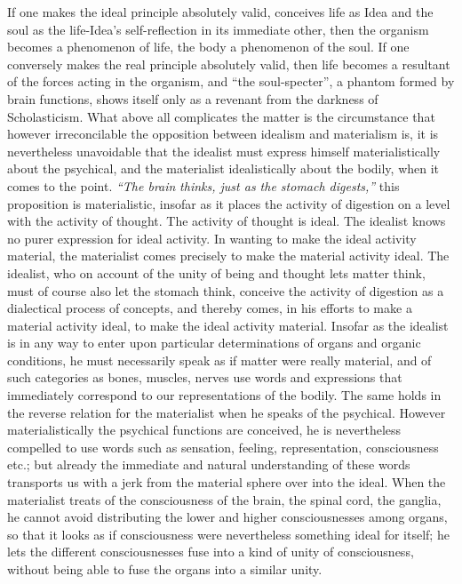 \documentclass[12pt,a4paper,openany]{book}
\newcommand{\opage}[1]{\marginnote{\footnotesize\textit{[#1]}}}
\begin{document}
If one makes the ideal principle absolutely valid, conceives life as Idea and the soul
as the life-Idea's self-reflection in its immediate other, then the organism becomes a
phenomenon of life, the body a phenomenon of the soul. If one conversely makes the real
principle absolutely valid, then life becomes a resultant of the forces acting in the
organism, and ``the soul-specter'', a phantom formed by brain functions, shows itself
only as a revenant from the darkness of Scholasticism. What above all complicates the
matter is the circumstance that however irreconcilable the opposition between idealism
and materialism is, it is nevertheless unavoidable that the idealist must express
himself materialistically about the psychical, and the materialist idealistically about
the bodily, when it comes to the point. \emph{``The brain}
\emph{thinks, just as the stomach digests,''} this proposition is materialistic,
insofar as it places the activity of digestion on a level with the activity of thought.
The activity of thought is ideal. The idealist knows no purer expression for ideal
activity. In wanting to make the ideal activity material, the materialist comes
precisely to make the material activity ideal. The idealist, who on account of the
unity of being and thought lets matter think, must of course also let the stomach
think, conceive the activity of digestion as a dialectical process of concepts, and
thereby comes, in his efforts to make a material activity ideal, to make the ideal
activity material. Insofar as the idealist is in any way to enter upon particular
determinations of organs and organic conditions, he must necessarily
\setcounter{footnote}{0}%
\opage{203}speak as if matter were really material, and of such categories as bones,
muscles, nerves use words and expressions that immediately correspond to our
representations of the bodily. The same holds in the reverse relation for the
materialist when he speaks of the psychical. However materialistically the psychical
functions are conceived, he is nevertheless compelled to use words such as sensation,
feeling, representation, consciousness etc.; but already the immediate and natural
understanding of these words transports us with a jerk from the material sphere over
into the ideal. When the materialist treats of the consciousness of the brain, the
spinal cord, the ganglia, he cannot avoid distributing the lower and higher
consciousnesses among organs, so that it looks as if consciousness were nevertheless
something ideal for itself; he lets the different consciousnesses fuse into a kind of
unity of consciousness, without being able to fuse the organs into a similar unity.
\end{document}
